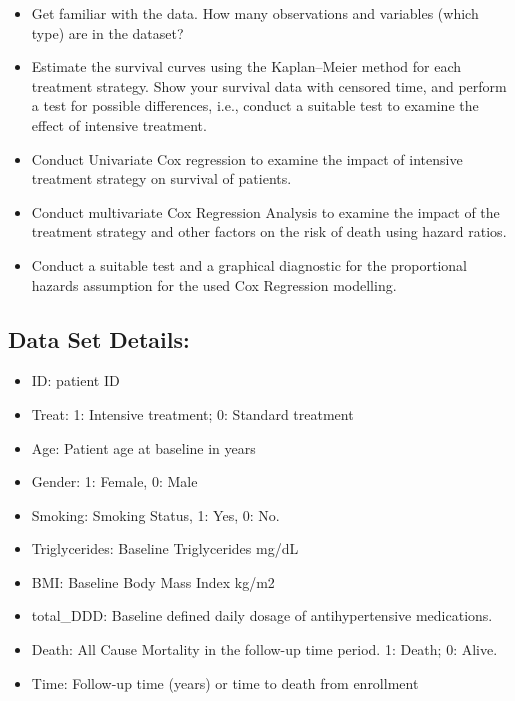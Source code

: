 \documentclass[
]{article}
\providecommand{\tightlist}{%
  \setlength{\itemsep}{0pt}\setlength{\parskip}{0pt}}
\begin{document}
\begin{itemize}
\tightlist
\item
  Get familiar with the data. How many observations and variables (which
  type) are in the dataset?
\item
  Estimate the survival curves using the Kaplan--Meier method for each
  treatment strategy. Show your survival data with censored time, and
  perform a test for possible differences, i.e., conduct a suitable test
  to examine the effect of intensive treatment.\\
\item
  Conduct Univariate Cox regression to examine the impact of intensive
  treatment strategy on survival of patients.
\item
  Conduct multivariate Cox Regression Analysis to examine the impact of
  the treatment strategy and other factors on the risk of death using
  hazard ratios.
\item
  Conduct a suitable test and a graphical diagnostic for the
  proportional hazards assumption for the used Cox Regression modelling.
\end{itemize}

\subsection{Data Set Details:}\label{data-set-details}

\begin{itemize}
\tightlist
\item
  ID: patient ID
\item
  Treat: 1: Intensive treatment; 0: Standard treatment
\item
  Age: Patient age at baseline in years
\item
  Gender: 1: Female, 0: Male\\
\item
  Smoking: Smoking Status, 1: Yes, 0: No.
\item
  Triglycerides: Baseline Triglycerides mg/dL
\item
  BMI: Baseline Body Mass Index kg/m2
\item
  total\_DDD: Baseline defined daily dosage of antihypertensive
  medications.
\item
  Death: All Cause Mortality in the follow-up time period. 1: Death; 0:
  Alive.
\item
  Time: Follow-up time (years) or time to death from enrollment
\end{itemize}
\end{document}
